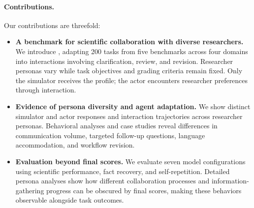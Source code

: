\paragraph{Contributions.}
Our contributions are threefold:
\begin{itemize}[leftmargin=*,nosep]
    \item \textbf{A benchmark for scientific collaboration with diverse researchers.}
    We introduce \benchmark, adapting 200 tasks from five benchmarks across
    four domains into interactions involving clarification, review, and
    revision. Researcher personas vary while task objectives and grading
    criteria remain fixed. Only the simulator receives the profile; the actor
    encounters researcher preferences through interaction.
    \item \textbf{Evidence of persona diversity and agent adaptation.}
    We show distinct simulator and actor responses and interaction
    trajectories across researcher personas. Behavioral analyses and case
    studies reveal differences in communication volume, targeted follow-up
    questions, language accommodation, and workflow revision.
    \item \textbf{Evaluation beyond final scores.}
    We evaluate seven model configurations using scientific performance,
    fact recovery, and self-repetition. Detailed persona analyses show how
    different collaboration processes and information-gathering progress
    can be obscured by final scores, making these behaviors observable
    alongside task outcomes.
\end{itemize}
